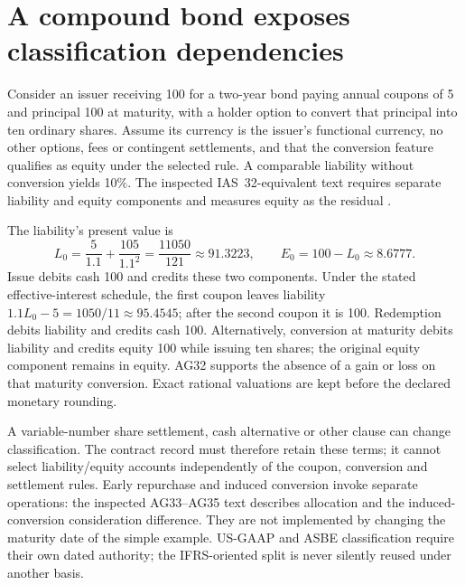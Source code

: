 




\section{A compound bond exposes classification dependencies}

Consider an issuer receiving 100 for a two-year bond paying annual coupons of
5 and principal 100 at maturity, with a holder option to convert that principal
into ten ordinary shares. Assume its currency is the issuer's functional
currency, no other options, fees or contingent settlements, and that the
conversion feature qualifies as equity under the selected rule. A comparable
liability without conversion yields 10\%. The inspected IAS~32-equivalent
text requires separate liability and equity components and measures equity
as the residual \citep[paragraphs 28--32, AG30--AG32]{aasb132}.

The liability's present value is
\[
 L_0=\frac{5}{1.1}+\frac{105}{1.1^2}
     =\frac{11050}{121}\approx91.3223,
 \qquad E_0=100-L_0\approx8.6777.
\]
Issue debits cash 100 and credits these two components. Under the stated
effective-interest schedule, the first coupon leaves liability
$1.1L_0-5=1050/11\approx95.4545$; after the second coupon it is 100.
Redemption debits liability and credits cash 100. Alternatively, conversion
at maturity debits liability and credits equity 100 while issuing ten shares;
the original equity component remains in equity. AG32 supports the absence
of a gain or loss on that maturity conversion. Exact rational valuations are
kept before the declared monetary rounding.

A variable-number share settlement, cash alternative or other clause can
change classification. The contract record must therefore retain these terms;
it cannot select liability/equity accounts independently of the coupon,
conversion and settlement rules. Early repurchase and induced conversion
invoke separate operations: the inspected AG33--AG35 text describes allocation
and the induced-conversion consideration difference. They are not implemented
by changing the maturity date of the simple example. US-GAAP and ASBE
classification require their own dated authority; the IFRS-oriented split is
never silently reused under another basis.





